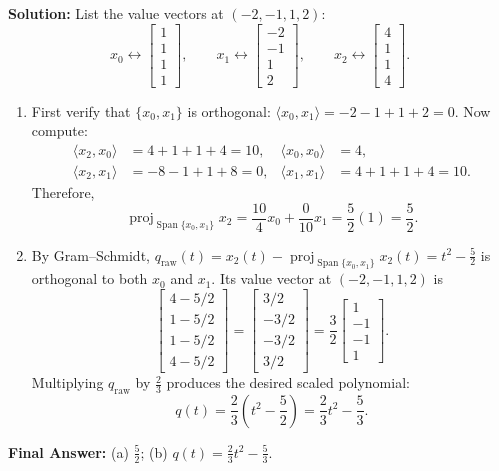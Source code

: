 \documentclass[11pt, letterpaper]{article}
\theoremstyle{definition}
\theoremstyle{remark}
\begin{document}
\textbf{Solution:} List the value vectors at $(-2, -1, 1, 2)$:
\[
x_0 \leftrightarrow \begin{bmatrix} 1 \\ 1 \\ 1 \\ 1 \end{bmatrix}, \qquad
x_1 \leftrightarrow \begin{bmatrix} -2 \\ -1 \\ 1 \\ 2 \end{bmatrix}, \qquad
x_2 \leftrightarrow \begin{bmatrix} 4 \\ 1 \\ 1 \\ 4 \end{bmatrix}.
\]
\begin{enumerate}[label=(\alph*)]
    \item First verify that $\{x_0, x_1\}$ is orthogonal: $\langle x_0, x_1 \rangle = -2 - 1 + 1 + 2 = 0$. Now compute:
    \begin{align*}
    \langle x_2, x_0 \rangle &= 4 + 1 + 1 + 4 = 10, & \langle x_0, x_0 \rangle &= 4, \\
    \langle x_2, x_1 \rangle &= -8 - 1 + 1 + 8 = 0, & \langle x_1, x_1 \rangle &= 4 + 1 + 1 + 4 = 10.
    \end{align*}
    Therefore,
    \[
    \operatorname{proj}_{\operatorname{Span}\{x_0, x_1\}} x_2 = \frac{10}{4}x_0 + \frac{0}{10}x_1 = \frac{5}{2}(1) = \frac{5}{2}.
    \]
    \item By Gram--Schmidt, $q_{\text{raw}}(t) = x_2(t) - \operatorname{proj}_{\operatorname{Span}\{x_0, x_1\}} x_2(t) = t^2 - \frac{5}{2}$ is orthogonal to both $x_0$ and $x_1$. Its value vector at $(-2, -1, 1, 2)$ is
    \[
    \begin{bmatrix} 4 - 5/2 \\ 1 - 5/2 \\ 1 - 5/2 \\ 4 - 5/2 \end{bmatrix} = \begin{bmatrix} 3/2 \\ -3/2 \\ -3/2 \\ 3/2 \end{bmatrix} = \frac{3}{2}\begin{bmatrix} 1 \\ -1 \\ -1 \\ 1 \end{bmatrix}.
    \]
    Multiplying $q_{\text{raw}}$ by $\frac{2}{3}$ produces the desired scaled polynomial:
    \[
    q(t) = \frac{2}{3}\left(t^2 - \frac{5}{2}\right) = \frac{2}{3}t^2 - \frac{5}{3}.
    \]
\end{enumerate}
\textbf{Final Answer:} (a) $\frac{5}{2}$; (b) $q(t) = \frac{2}{3}t^2 - \frac{5}{3}$.
\end{document}
